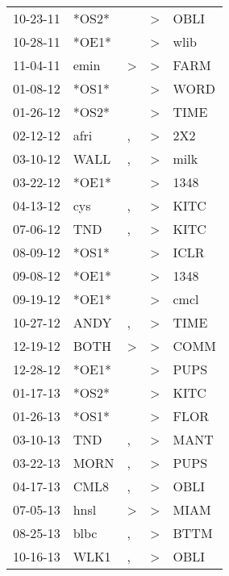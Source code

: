 \begin{supertabular}{lllll}
 10-23-11 &  *OS2* &                  &     \textgreater &   OBLI \\
 10-28-11 &  *OE1* &                  &     \textgreater &   wlib \\
 11-04-11 &   emin &     \textgreater &     \textgreater &   FARM \\
 01-08-12 &  *OS1* &                  &     \textgreater &   WORD \\
 01-26-12 &  *OS2* &                  &     \textgreater &   TIME \\
 02-12-12 &   afri &                , &     \textgreater &    2X2 \\
 03-10-12 &   WALL &                , &     \textgreater &   milk \\
 03-22-12 &  *OE1* &                  &     \textgreater &   1348 \\
 04-13-12 &    cys &                , &     \textgreater &   KITC \\
 07-06-12 &    TND &                , &     \textgreater &   KITC \\
 08-09-12 &  *OS1* &                  &     \textgreater &   ICLR \\
 09-08-12 &  *OE1* &                  &     \textgreater &   1348 \\
 09-19-12 &  *OE1* &                  &     \textgreater &   cmcl \\
 10-27-12 &   ANDY &                , &     \textgreater &   TIME \\
 12-19-12 &   BOTH &     \textgreater &     \textgreater &   COMM \\
 12-28-12 &  *OE1* &                  &     \textgreater &   PUPS \\
 01-17-13 &  *OS2* &                  &     \textgreater &   KITC \\
 01-26-13 &  *OS1* &                  &     \textgreater &   FLOR \\
 03-10-13 &    TND &                , &     \textgreater &   MANT \\
 03-22-13 &   MORN &                , &     \textgreater &   PUPS \\
 04-17-13 &   CML8 &                , &     \textgreater &   OBLI \\
 07-05-13 &   hnsl &     \textgreater &     \textgreater &   MIAM \\
 08-25-13 &   blbc &                , &     \textgreater &   BTTM \\
 10-16-13 &   WLK1 &                , &     \textgreater &   OBLI \\

\end{supertabular}
